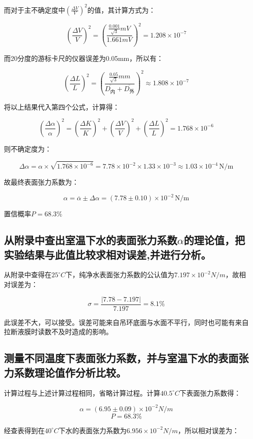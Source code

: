 \documentclass{ctexart}
\begin{document}
而对于主不确定度中$\left(\frac{\Delta V}{V}\right)^2$的值，其计算方式为：

$$ \left(\frac{\Delta V}{V}\right)^2 = \left(\frac{\frac{0.001}{\sqrt{3}}mV}{1.661mV}\right)^2 = 1.208 \times 10^{-7} $$

而20分度的游标卡尺的仪器误差为0.05mm，所以有：

$$ \left(\frac{\Delta L}{L}\right)^2 = \left(\frac{\frac{0.05}{\sqrt{3}}mm}{\overline{D_\text{内}}+\overline{D_\text{外}}}\right)^2 \approx 1.808 \times 10^{-7} $$

将以上结果代入第四个公式，计算得：

$$ \left(\frac{\Delta \alpha}{\alpha}\right)^2 = \left(\frac{\Delta K}{K}\right)^2 + \left(\frac{\Delta V}{V}\right)^2 + \left(\frac{\Delta L}{L}\right)^2 = 1.768 \times 10^{-6} $$

则不确定度为：

$$ \Delta\alpha = \alpha\times\sqrt{1.768 \times 10^{-6}} = 7.78 \times 10^{-2} \times 1.33 \times 10^{-3} \approx 1.03 \times 10^{-4} \, \text{N/m} $$

故最终表面张力系数为：

$$ \alpha = \overline{\alpha} \pm \Delta\alpha = (7.78 \pm 0.10) \times 10^{-2} \, \text{N/m} $$

置信概率$P = 68.3\%$

\subsection{从附录中查出室温下水的表面张力系数$\alpha$的理论值，把实验结果与此值比较求相对误差,并进行分析。}

从附录中查得在$25^\circ C$下，纯净水表面张力系数的公认值为$7.197\times10^{-2}N/m$，故相对误差为：

$$ \sigma = \frac{\vert 7.78-7.197\vert }{7.197} = 8.1\% $$

此误差不大，可以接受。误差可能来自吊环底面与水面不平行，同时也可能有来自拉断液膜时读数不及时造成的影响。

\subsection{测量不同温度下表面张力系数，并与室温下水的表面张力系数理论值作分析比较。}

计算过程与上述计算过程相同，省略计算过程。计算$40.5^\circ C$下表面张力系数得：

$$ \alpha = (6.95 \pm 0.09) \times 10^{-2} N/m $$
$$ P = 68.3 \% $$

经查表得到在$40^\circ C$下水的表面张力系数为$6.956\times 10^{-2} N/m$，所以相对误差为：
\end{document}
